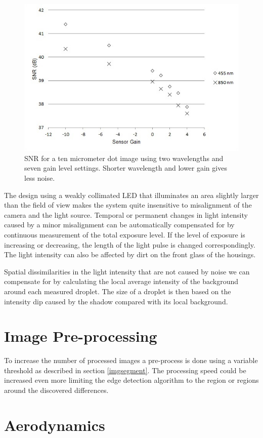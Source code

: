 \begin{figure}%
\centering\includegraphics[width=0.6\linewidth]{figures/NoiseGain}
\caption{SNR for a ten micrometer dot image using two wavelengths and seven gain level settings. Shorter wavelength and lower gain gives less noise.}
\label{fig:noisegain}
\end{figure}

The design using a weakly collimated LED that illuminates an area slightly larger than the field of view makes the system quite insensitive to misalignment of the camera and the light source. Temporal or permanent changes in light intensity caused by a minor misalignment can be automatically compensated for by continuous measurement of the total exposure level. If the level of exposure is increasing or decreasing, the length of the light pulse is changed correspondingly. The light intensity can also be affected by dirt on the front glass of the housings. 

Spatial dissimilarities in the light intensity that are not caused by noise we can compensate for by calculating the local average intensity of the background around each measured droplet. The size of a droplet is then based on the intensity dip caused by the shadow compared with its local background.

\section{Image Pre-processing}

To increase the number of processed images a pre-process is done using a variable threshold as described in section \ref{imgsegment}. The processing speed could be increased even more limiting the edge detection algorithm to the region or regions around the discovered differences.

\section{Aerodynamics}

